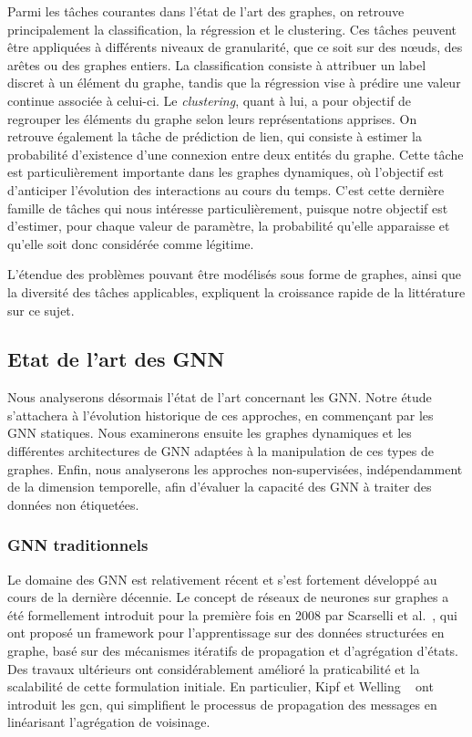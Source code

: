 \documentclass[a4paper,11pt,twoside]{StyleThese}
\begin{document}
Parmi les tâches courantes dans l’état de l’art des graphes, on retrouve principalement la classification, la régression et le clustering. Ces tâches peuvent être appliquées à différents niveaux de granularité, que ce soit sur des nœuds, des arêtes ou des graphes entiers. La classification consiste à attribuer un label discret à un élément du graphe, tandis que la régression vise à prédire une valeur continue associée à celui-ci. Le \textit{clustering}, quant à lui, a pour objectif de regrouper les éléments du graphe selon leurs représentations apprises. On retrouve également la tâche de prédiction de lien, qui consiste à estimer la probabilité d’existence d’une connexion entre deux entités du graphe. Cette tâche est particulièrement importante dans les graphes dynamiques, où l’objectif est d’anticiper l’évolution des interactions au cours du temps. C’est cette dernière famille de tâches qui nous intéresse particulièrement, puisque notre objectif est d’estimer, pour chaque valeur de paramètre, la probabilité qu’elle apparaisse et qu’elle soit donc considérée comme légitime.

L’étendue des problèmes pouvant être modélisés sous forme de graphes, ainsi que la diversité des tâches applicables, expliquent la croissance rapide de la littérature sur ce sujet.

\subsection{Etat de l'art des GNN}
Nous analyserons désormais l’état de l’art concernant les GNN. Notre étude s’attachera à l’évolution historique de ces approches, en commençant par les GNN statiques. Nous examinerons ensuite les graphes dynamiques et les différentes architectures de GNN adaptées à la manipulation de ces types de graphes. Enfin, nous analyserons les approches non-supervisées, indépendamment de la dimension temporelle, afin d’évaluer la capacité des GNN à traiter des données non étiquetées.

\subsubsection{GNN traditionnels}
Le domaine des GNN est relativement récent et s’est fortement développé au cours de la dernière décennie. Le concept de réseaux de neurones sur graphes a été formellement introduit pour la première fois en 2008 par Scarselli et al.~\cite{gnn}, qui ont proposé un framework pour l’apprentissage sur des données structurées en graphe, basé sur des mécanismes itératifs de propagation et d’agrégation d’états. Des travaux ultérieurs ont considérablement amélioré la praticabilité et la scalabilité de cette formulation initiale. En particulier, Kipf et Welling ~\cite{gcn} ont introduit les \gls{gcn}, qui simplifient le processus de propagation des messages en linéarisant l’agrégation de voisinage.
\end{document}
